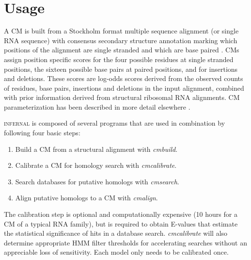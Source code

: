 \section{Usage} 

A CM is built from a Stockholm format multiple sequence alignment (or
single RNA sequence) with consensus secondary structure annotation
marking which positions of the alignment are single stranded and which
are base paired \citep{infguide03}. CMs assign position specific
scores for the four possible residues at single stranded positions,
the sixteen possible base pairs at paired positions, and for
insertions and deletions. These scores are log-odds scores derived
from the observed counts of residues, base pairs, insertions and
deletions in the input alignment, combined with prior information
derived from structural ribosomal RNA alignments.  CM parameterization
has been described in more detail elsewhere
\citep{Eddy94,Eddy02b,infguide03,NawrockiEddy07}.

\textsc{infernal} is composed of several programs that are used in
combination by following four basic steps: 

\begin{enumerate}
\item Build a CM from a structural alignment with \emph{cmbuild}.
\item Calibrate a CM for homology search with \emph{cmcalibrate}.
\item Search databases for putative homologs with \emph{cmsearch}.
\item Align putative homologs to a CM with \emph{cmalign}.
\end{enumerate}

The calibration step is optional and computationally expensive (10
hours for a CM of a typical RNA family), but is required to obtain
E-values that estimate the statistical significance of hits in a
database search. \emph{cmcalibrate} will also determine appropriate
HMM filter thresholds for accelerating searches without an appreciable
loss of sensitivity. Each model only needs to be calibrated once.


